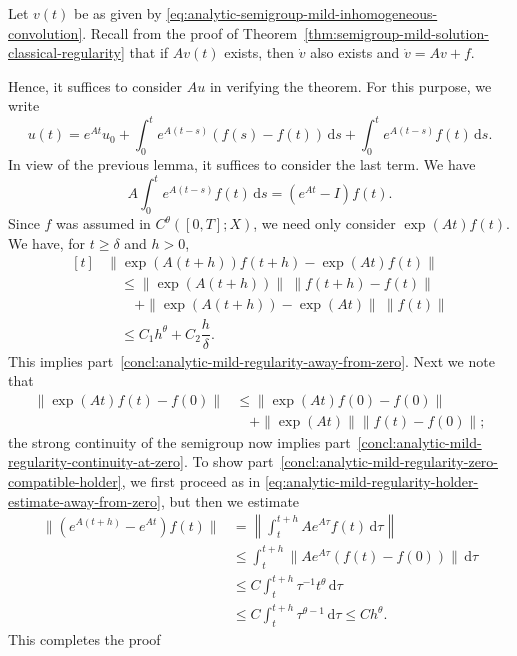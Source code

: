 \begin{Proof}
Let $v(t)$ be as given by \eqref{eq:analytic-semigroup-mild-inhomogeneous-convolution}. Recall from the proof of Theorem~\ref{thm:semigroup-mild-solution-classical-regularity} that if $Av(t)$ exists, then $\dot v$ also exists and $\dot v=Av+f$.\par Hence, it suffices to consider $Au$ in verifying the theorem. For this purpose, we write
\begin{equation}\label{eq:analytic-mild-regularity-three-part-solution-splitting}
u(t)=e^{At}u_0+\int_0^t e^{A(t-s)}(f(s)-f(t))\,\mathrm{d}s+\int_0^t e^{A(t-s)}f(t)\,\mathrm{d}s.
\end{equation}
In view of the previous lemma, it suffices to consider the last term. We have
\begin{equation}\label{eq:analytic-mild-regularity-frozen-data-generator-integral}
A\int_0^t e^{A(t-s)}f(t)\,\mathrm{d}s=(e^{At}-I)f(t).
\end{equation}
Since $f$ was assumed in $C^\theta([0,T];X)$, we need only consider $\exp(At)f(t)$. We have, for $t\geq\delta$ and $h>0$,
\begin{equation}\label{eq:analytic-mild-regularity-holder-estimate-away-from-zero}
\begin{aligned}[t]&\|\exp(A(t+h))f(t+h)-\exp(At)f(t)\|\\&\quad\leq\|\exp(A(t+h))\|\ \|f(t+h)-f(t)\|\\&\qquad+\|\exp(A(t+h))-\exp(At)\|\ \|f(t)\|\\&\quad\leq C_1h^\theta+C_2\dfrac{h}{\delta}.\end{aligned}
\end{equation}
This implies part~\ref{concl:analytic-mild-regularity-away-from-zero}. Next we note that
\begin{equation}\label{eq:analytic-mild-regularity-initial-strong-continuity-bound}
\begin{aligned}\|\exp(At)f(t)-f(0)\|&\leq\|\exp(At)f(0)-f(0)\|\\&\quad+\|\exp(At)\|\|f(t)-f(0)\|;\end{aligned}
\end{equation}
the strong continuity of the semigroup now implies part~\ref{concl:analytic-mild-regularity-continuity-at-zero}. To show part~\ref{concl:analytic-mild-regularity-zero-compatible-holder}, we first proceed as in \eqref{eq:analytic-mild-regularity-holder-estimate-away-from-zero}, but then we estimate\[\begin{aligned}
\|(e^{A(t+h)}-e^{At})f(t)\|&=\left\|\int_t^{t+h}Ae^{A\tau}f(t)\,\mathrm{d}\tau\right\|\\
&\leq\int_t^{t+h}\|Ae^{A\tau}(f(t)-f(0))\|\,\mathrm{d}\tau\\
&\leq C\int_t^{t+h}\tau^{-1}t^\theta\,\mathrm{d}\tau\\
&\leq C\int_t^{t+h}\tau^{\theta-1}\,\mathrm{d}\tau\leq Ch^\theta.
\end{aligned}\]This completes the proof
\end{Proof}

